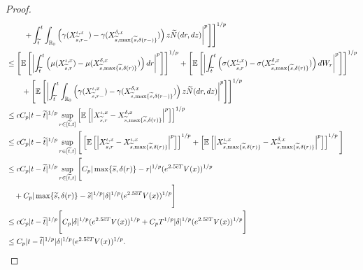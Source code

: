 \documentclass[11pt]{article}
\theoremstyle{theorem}
\theoremstyle{definition}
\newcommand{\bR}{\mathbb{R}}
\newcommand{\1}{{\bf 1}}
\begin{document}
\begin{proof}
\begin{align}
& \quad \quad \left. \left. \left. + \int^t_{\widetilde{t}} \int_{\bR_0} \left(\gamma(X_{\widetilde{s}, r-}^{\iota, x})-\gamma(X_{\widetilde{s}, \max \{\widetilde{s}, \delta(r-) \}}^{\delta, x}) \right) z \widetilde{N}(dr, dz) \right|^p \right]\right]^{1/p} \notag\\
& \leq \left[\mathbb{E}\left[ \left|\int^t_{\widetilde{t}}  \left( \mu(X_{\widetilde{s}, r}^{\iota, x})-\mu(X_{\widetilde{s}, \max \{\widetilde{s}, \delta(r) \}}^{\delta, x}) \right) dr\right|^p \right]\right]^{1/p} + \left[\mathbb{E}\left[ \left|\int^t_{\widetilde{t}} \left( \sigma(X_{\widetilde{s}, r}^{\iota, x}) -\sigma(X_{\widetilde{s}, \max \{\widetilde{s}, \delta(r) \}}^{\delta, x})\right) dW_r \right|^p \right]\right]^{1/p} \notag\\
& \quad \quad  + \left[\mathbb{E}\left[ \left|\int^t_{\widetilde{t}} \int_{\bR_0} \left(\gamma(X_{\widetilde{s}, r-}^{\iota, x})-\gamma(X_{\widetilde{s}, \max \{\widetilde{s}, \delta(r-) \}}^{\delta, x}) \right) z \widetilde{N}(dr, dz) \right|^p \right]\right]^{1/p} \notag\\
&\leq c C_p |t-\widetilde{t}|^{1/p} \sup_{r\in [ \widetilde{t}, t]} \left[ \mathbb{E} \left[\left| X_{\widetilde{s}, r}^{\iota, x}-X_{\widetilde{s}, \max \{\widetilde{s}, \delta(r) \}}^{\delta, x} \right|^p \right]\right]^{1/p} \notag\\
&\leq c C_p |t-\widetilde{t}|^{1/p} \sup_{r\in [ \widetilde{t}, t]} \Bigg[ \left[ \mathbb{E} \left[\left| X_{\widetilde{s}, r}^{\iota, x}-X_{\widetilde{s}, \max \{\widetilde{s}, \delta(r) \}}^{\iota, x} \right|^p \right]\right]^{1/p} + \left[ \mathbb{E} \left[\left| X_{\widetilde{s}, \max \{\widetilde{s}, \delta(r) \}}^{\iota, x}-X_{\widetilde{s}, \max \{\widetilde{s}, \delta(r) \}}^{\delta, x} \right|^p \right]\right]^{1/p} \Bigg] \notag\\
&\leq  c C_p |t-\widetilde{t}|^{1/p} \sup_{r\in [ \widetilde{t}, t]} \Bigg[C_p | \max \{\widetilde{s}, \delta(r) \} -r |^{1/p} (e^{2.5\overline{c}T} V(x))^{1/p} \notag\\ 
& \quad +  C_p  |\max \{\widetilde{s}, \delta(r) \} -\widetilde{s} |^{1/p} |\delta|^{1/p}(e^{2.5\overline{c}T}V(x))^{1/p} \Bigg] \notag\\
&\leq  c C_p |t-\widetilde{t}|^{1/p} \Bigg[C_p |\delta|^{1/p} (e^{2.5\overline{c}T} V(x))^{1/p}  +  C_p T^{1/p}  |\delta|^{1/p} (e^{2.5\overline{c}T}V(x))^{1/p} \Bigg] \notag\\
& \leq C_p |t-\widetilde{t}|^{1/p} |\delta|^{1/p} (e^{2.5\overline{c}T}V(x))^{1/p}. 

\end{align}
\end{proof}
\end{document}
